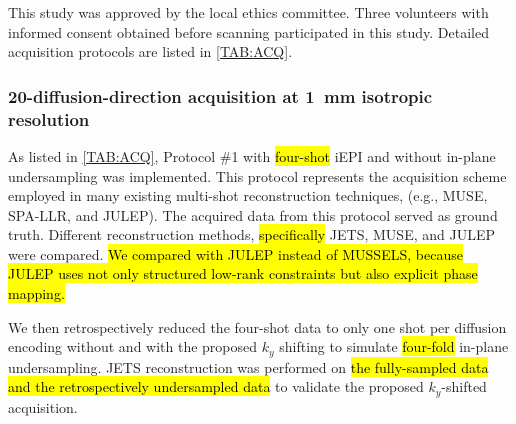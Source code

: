 \documentclass[preprint,12pt,authoryear,review]{elsarticle}
\begin{document}

    This study was approved by the local ethics committee.
    Three volunteers with informed consent obtained before scanning
    participated in this study.
    Detailed acquisition protocols are listed in \cref{TAB:ACQ}.


	\subsubsection{20-diffusion-direction acquisition
    at \SI{1}{\milli\meter} isotropic resolution}

	As listed in \cref{TAB:ACQ}, Protocol \#1
	with \hl{four-shot} iEPI and without in-plane undersampling
	was implemented. This protocol represents the acquisition scheme
	employed in many existing multi-shot reconstruction techniques,
	(e.g., MUSE, SPA-LLR, and JULEP).
	The acquired data from this protocol served as ground truth.
    Different reconstruction methods,
    \hl{specifically} JETS, MUSE, and JULEP were compared.
    \hl{We compared with JULEP instead of MUSSELS,
    because JULEP uses not only structured low-rank constraints
    but also explicit phase mapping.}

	We then retrospectively reduced the four-shot data to only one shot
	per diffusion encoding without and with the proposed $k_y$ shifting
    to simulate \hl{four-fold} in-plane undersampling.
    JETS reconstruction was performed on \hl{the fully-sampled data
    and the retrospectively undersampled data} 
    to validate the proposed $k_y$-shifted acquisition.
\end{document}
